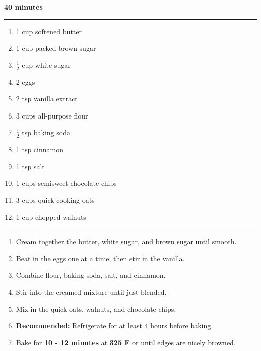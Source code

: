  \hfill {\large \textbf{40 minutes}}
\vspace{15pt}
\hrule
\vspace{15pt}
\begin{enumerate}
	\item 1 cup softened butter
	\item 1 cup packed brown sugar
	\item $\frac{1}{2}$ cup white sugar
	\item 2 eggs
	\item 2 tsp vanilla extract
	\item 3 cups all-purpose flour
	\item $\frac{1}{2}$ tsp baking soda
	\item 1 tsp cinnamon
	\item 1 tsp salt
	\item 1 cups semisweet chocolate chips
	\item 3 cups quick-cooking oats
	\item 1 cup chopped walnuts
\end{enumerate}
\vspace{15 pt}
\hrule
\vspace{15 pt}
\begin{enumerate}
	\item Cream together the butter, white sugar, and brown sugar until smooth.
	\item Beat in the eggs one at a time, then stir in the vanilla.
	\item Combine flour, baking soda, salt, and cinnamon.
	\item Stir into the creamed mixture until just blended.
	\item Mix in the quick oats, walnuts, and chocolate chips.
	\item \textbf{Recommended:} Refrigerate for at least 4 hours before baking.
	\item Bake for \textbf{10 - 12 minutes} at \textbf{325 F} or until edges are nicely browned.
\end{enumerate}
